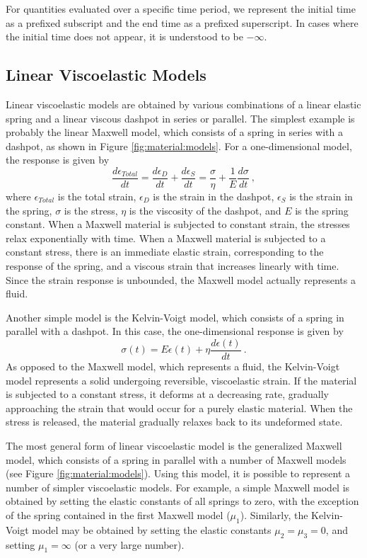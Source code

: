 For quantities evaluated over a specific time period, we represent
the initial time as a prefixed subscript and the end time as a prefixed
superscript. In cases where the initial time does not appear, it is
understood to be $-\infty$.

\subsection{Linear Viscoelastic Models}

Linear viscoelastic models are obtained by various combinations of
a linear elastic spring and a linear viscous dashpot in series or
parallel. The simplest example is probably the linear Maxwell model,
which consists of a spring in series with a dashpot, as shown in Figure
\vref{fig:material:models}. For a one-dimensional model, the response
is given by
\begin{equation}
\frac{d\epsilon_{Total}}{dt}=\frac{d\epsilon_{D}}{dt}+\frac{d\epsilon_{S}}{dt}=\frac{\sigma}{\eta}+\frac{1}{E}\frac{d\sigma}{dt}\:,
\end{equation}
where $\epsilon_{Total}$ is the total strain, $\epsilon_{D}$ is
the strain in the dashpot, $\epsilon_{S}$ is the strain in the spring,
$\sigma$ is the stress, $\eta$ is the viscosity of the dashpot,
and $E$ is the spring constant. When a Maxwell material is subjected
to constant strain, the stresses relax exponentially with time. When
a Maxwell material is subjected to a constant stress, there is an
immediate elastic strain, corresponding to the response of the spring,
and a viscous strain that increases linearly with time. Since the
strain response is unbounded, the Maxwell model actually represents
a fluid.

Another simple model is the Kelvin-Voigt model, which consists of
a spring in parallel with a dashpot. In this case, the one-dimensional
response is given by
\begin{equation}
\sigma\left(t\right)=E\epsilon\left(t\right)+\eta\frac{d\epsilon\left(t\right)}{dt}\:.
\end{equation}
As opposed to the Maxwell model, which represents a fluid, the Kelvin-Voigt
model represents a solid undergoing reversible, viscoelastic strain.
If the material is subjected to a constant stress, it deforms at a
decreasing rate, gradually approaching the strain that would occur
for a purely elastic material. When the stress is released, the material
gradually relaxes back to its undeformed state.

The most general form of linear viscoelastic model is the generalized
Maxwell model, which consists of a spring in parallel with a number
of Maxwell models (see Figure \vref{fig:material:models}). Using this
model, it is possible to represent a number of simpler viscoelastic
models. For example, a simple Maxwell model is obtained by setting
the elastic constants of all springs to zero, with the exception of
the spring contained in the first Maxwell model ($\mu_{1}$). Similarly,
the Kelvin-Voigt model may be obtained by setting the elastic constants
$\mu_{2}=\mu_{3}=0$, and setting $\mu_{1}=\infty$ (or a very large
number).


